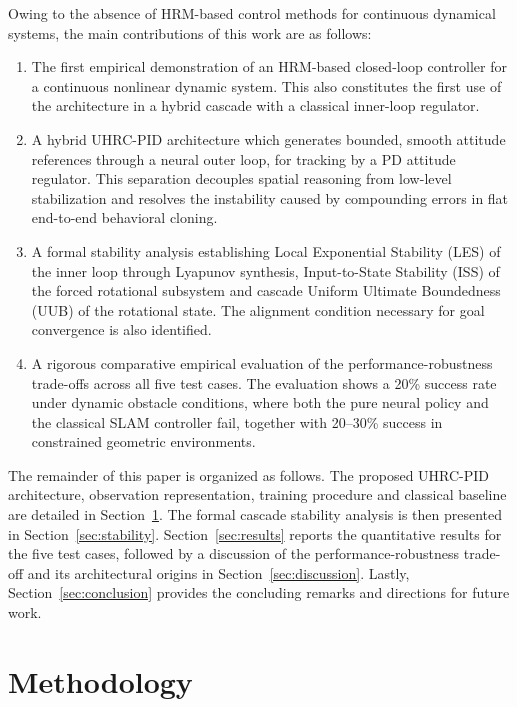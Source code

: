 \documentclass[12pt, a4paper]{article}
\begin{document}
Owing to the absence of HRM-based control methods for continuous dynamical systems, the main contributions of this work are as follows:
\begin{enumerate}
    \item The first empirical demonstration of an HRM-based closed-loop controller for a continuous nonlinear dynamic system.
          This also constitutes the first use of the architecture in a hybrid cascade with a classical inner-loop regulator.

    \item A hybrid UHRC-PID architecture which generates bounded, smooth attitude references through a neural outer loop, for tracking by a PD attitude regulator.
          This separation decouples spatial reasoning from low-level stabilization and resolves the instability caused by compounding errors in flat end-to-end behavioral cloning.

    \item A formal stability analysis establishing Local Exponential Stability (LES) of the inner loop through Lyapunov synthesis, Input-to-State Stability (ISS) of the forced rotational subsystem and cascade Uniform Ultimate Boundedness (UUB) of the rotational state.
          The alignment condition necessary for goal convergence is also identified.

    \item A rigorous comparative empirical evaluation of the performance-robustness trade-offs across all five test cases.
          The evaluation shows a 20\% success rate under dynamic obstacle conditions, where both the pure neural policy and the classical SLAM controller fail, together with 20--30\% success in constrained geometric environments.
\end{enumerate}

The remainder of this paper is organized as follows.
The proposed UHRC-PID architecture, observation representation, training procedure and classical baseline are detailed in Section~\ref{sec:method}.
The formal cascade stability analysis is then presented in Section~\ref{sec:stability}.
Section~\ref{sec:results} reports the quantitative results for the five test cases, followed by a discussion of the performance-robustness trade-off and its architectural origins in Section~\ref{sec:discussion}.
Lastly, Section~\ref{sec:conclusion} provides the concluding remarks and directions for future work.

\section{Methodology}
\label{sec:method}
\end{document}
